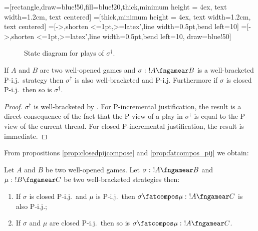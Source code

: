 =[rectangle,draw=blue!50,fill=blue!20,thick,minimum
height = 4ex, text width=1.2cm, text centered]
=[thick,minimum
height = 4ex, text width=1.2cm, text centered]
=[->,shorten <=1pt,>=latex',line width=0.5pt,bend left=10]
=[->,shorten <=1pt,>=latex',line width=0.5pt,bend left=10, draw=blue!50]
\begin{figure}[htbp]
\begin{center}
\end{center}
\caption{State diagram for plays of $\sigma^\dag$.}
\label{fig:promotion_state_diagram}
\end{figure}



\begin{proposition}
\label{prop:fatcompos_pij} If $A$ and $B$ are two well-opened games
and $\sigma :\ !A \fngamear B$ is a well-bracketed P-i.j.\ strategy
then $\sigma^\dag$ is also well-bracketed and P-i.j. Furthermore if
$\sigma$ is closed P-i.j.\ then so is $\sigma^\dagger$.
\end{proposition}
\begin{proof}
$\sigma^\dag$ is well-bracketed by \cite[Proposition
2.10.]{abramsky94full}. For P-incremental justification, the result is a direct consequence of the
fact that the P-view of a play in $\sigma^\dag$ is equal to the P-view of the current thread.
For closed P-incremental justification, the result is immediate.
\end{proof}

From propositions \ref{prop:closedpijcompose} and
\ref{prop:fatcompos_pij} we obtain:
\begin{corollary}
Let $A$ and $B$ be two well-opened games. Let $\sigma :\ !A
\fngamear B$ and $\mu :\ !B\fngamear C$ be two well-bracketed
strategies then:
\begin{enumerate}
\item If $\sigma$ is closed P-i.j.\ and $\mu$ is P-i.j.\ then $\sigma \fatcompos \mu :\ !A \fngamear
C$ is also P-i.j.;
\item If $\sigma$ and $\mu$ are closed P-i.j.\ then so is $\sigma \fatcompos \mu :\ !A \fngamear C$.
\end{enumerate}
\end{corollary}

